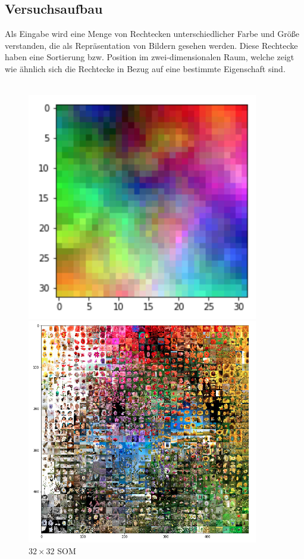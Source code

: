 \documentclass[12pt, ngerman, utf8]{article}
\begin{document}
\subsection{Versuchsaufbau}
Als Eingabe wird eine Menge von Rechtecken unterschiedlicher Farbe und Größe verstanden, die als Repräsentation von Bildern gesehen werden. Diese Rechtecke haben eine Sortierung bzw. Position im zwei-dimensionalen Raum, welche zeigt wie ähnlich sich die Rechtecke in Bezug auf eine bestimmte Eigenschaft sind.\\\\
\begin{figure}[h]
\centering
\begin{minipage}{.40\textwidth}
  \centering
  \includegraphics[width=0.9\textwidth]{./imgs/32mal32-som.png}
  \caption{$32\times32$ SOM}
  \label{fig:32som}
\end{minipage}%
\hfill
\begin{minipage}{.55\textwidth}
  \centering
  \includegraphics[width=0.9\textwidth]{./imgs/32x32-flowers.png}

\end{minipage}
\end{figure}
\end{document}
